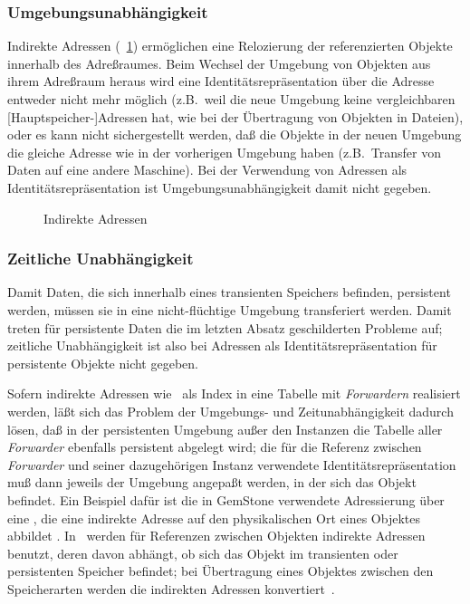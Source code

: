 \subsubsection{Umgebungsunabh\"{a}ngigkeit}
%
Indirekte Adressen (\figurename~\ref{fig:indadr})
%
erm\"{o}glichen eine Relozierung der referenzierten Objekte innerhalb des
Adre\ss{}raumes. Beim Wechsel der Umgebung von Objekten aus ihrem
Adre\ss{}raum heraus wird eine Identit\"{a}tsrepr\"{a}sentation \"{u}ber die
Adresse entweder nicht mehr m\"{o}glich (z.B.\ weil die neue Umgebung
keine vergleichbaren [Hauptspeicher-]Adressen hat, wie bei der
\"{U}ber\-tra\-gung von Objekten in Dateien), oder es kann nicht
sichergestellt werden, da\ss{} die Objekte in der neuen Umgebung die
gleiche Adresse wie in der vorherigen Umgebung haben (z.B.\ Transfer
von Daten auf eine andere Maschine).  Bei der Verwendung von Adressen
als Iden\-ti\-t\"{a}ts\-re\-pr\"{a}\-sen\-ta\-tion ist
Umgebungsunabh\"{a}ngigkeit damit nicht gegeben.
%
\begin{figure}[htbp]%
\ifbuch%
\centerline{}%
\else%
\centerline{}%
\fi%
\caption{Indirekte Adressen}\label{fig:indadr}%
\end{figure}%
%
\subsubsection{Zeitliche Unabh\"{a}ngigkeit}
%
Damit Daten, die sich innerhalb eines transienten Speichers befinden,
persistent werden, m\"{u}ssen sie in eine nicht-fl\"{u}chtige Umgebung
transferiert werden. Damit treten f\"{u}r persistente Daten die im
letzten Absatz geschilderten Probleme auf; zeitliche Unabh\"{a}ngigkeit
ist also bei Adressen als Identit\"{a}tsrepr\"{a}sentation f\"{u}r persistente
Objekte nicht gegeben.
%
\par{}Sofern indirekte Adressen wie \og\ als Index in eine
Tabelle mit {\em Forwardern\/} realisiert werden, l\"{a}\ss{}t sich das
Problem der Umgebungs- und Zeitunabh\"{a}ngigkeit dadurch l\"{o}sen, da\ss{} in
der persistenten Umgebung au\ss{}er den Instanzen die Tabelle aller
{\em Forwarder\/} ebenfalls persistent abgelegt wird; die f\"{u}r die
Referenz zwischen {\em Forwarder\/} und seiner dazugeh\"{o}rigen Instanz
verwendete Identit\"{a}tsrepr\"{a}sentation mu\ss{} dann jeweils der Umgebung
angepa\ss{}t werden, in der sich das Objekt befindet. Ein Beispiel daf\"{u}r
ist die in GemStone verwendete Adressierung \"{u}ber eine
, die eine indirekte Adresse auf
den physikalischen Ort eines Objektes abbildet
\cite[]{bib:ma87}. In \ werden f\"{u}r Referenzen zwischen Objekten indirekte Adressen
benutzt, deren \representationform{} davon abh\"{a}ngt, ob sich das Objekt
im transienten oder persistenten Speicher befindet; bei
\"{U}ber\-tra\-gung eines Objektes zwischen den Speicherarten werden die
indirekten Adressen
konvertiert\ \linebreak[4]\cite[]{bib:ka90}.
%
